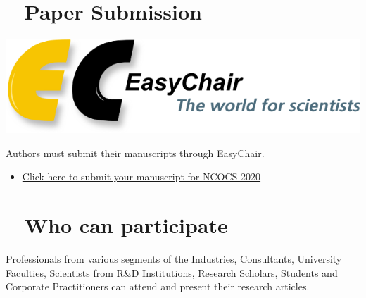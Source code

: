 \documentclass[12pt,a3paper, foldmark,notumble]{leaflet}
\begin{document}
\section{\faCloudUpload~  Paper Submission}
\includegraphics[scale=0.30]{easychair}

Authors must submit their manuscripts through EasyChair.
\begin{itemize}
	\item[\faHandORight ] \href{https://easychair.org/conferences/?conf=ncocs2020}{Click here to submit your manuscript for NCOCS-2020}
\end{itemize}

\section{\faGroup~  \textbf{Who can participate}}
Professionals from various segments of the Industries, Consultants, University Faculties, Scientists from R\&D Institutions, Research Scholars, Students and Corporate Practitioners can attend and present their research articles.
\end{document}
